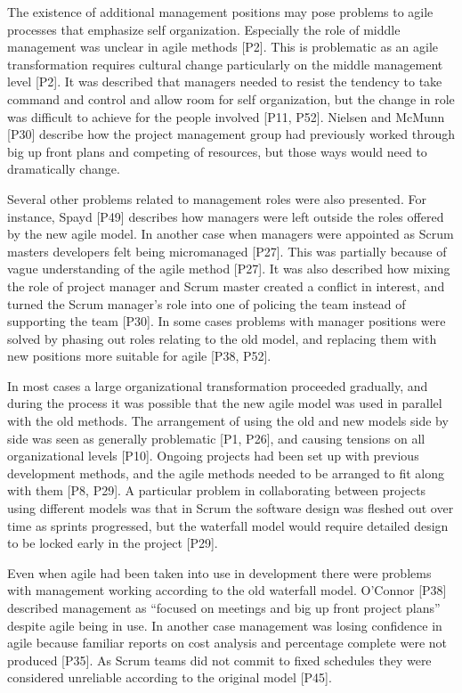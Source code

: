 
The existence of additional management positions may pose problems to agile
processes that emphasize self organization.
Especially the role of middle management was unclear in agile methods [P2]. This
is problematic as an agile transformation requires cultural change particularly
on the middle management level [P2].
It was described that managers needed to resist the tendency to take command and
control and allow room for self organization, but the change in role was
difficult to achieve for the people involved [P11, P52].
Nielsen and McMunn [P30] describe how the project management group had
previously worked through big up front plans and competing of resources, but
those ways would need to dramatically change.

Several other problems related to management roles were also presented. For
instance, Spayd [P49] describes how managers were left outside the roles offered
by the new agile model. In another case when managers were appointed as Scrum
masters developers felt being micromanaged [P27]. This was partially because of
vague understanding of the agile method [P27]. It was also described how mixing
the role of project manager and Scrum master created a conflict in interest, and
turned the Scrum manager's role into one of policing the team instead of
supporting the team [P30]. In some cases problems with manager positions were
solved by phasing out roles relating to the old model, and replacing them with
new positions more suitable for agile [P38, P52].


In most cases a large organizational transformation proceeded gradually, and
during the process it was possible that the new agile model was used in parallel
with the old methods. The arrangement of using the old and new models side by
side was seen as generally problematic [P1, P26], and causing tensions on all
organizational levels [P10]. Ongoing projects had been set up with previous
development methods, and the agile methods needed to be arranged to fit along
with them [P8, P29]. A particular problem in collaborating between projects
using different models was that in Scrum the software design was fleshed out
over time as sprints progressed, but the waterfall model would require detailed
design to be locked early in the project [P29].

Even when agile had been taken into use in development there were problems with
management working according to the old waterfall model. O'Connor [P38]
described management as ``focused on meetings and big up front project plans''
despite agile being in use. In another case management was losing confidence in
agile because familiar reports on cost analysis and percentage complete were not
produced [P35]. As Scrum teams did not commit to fixed schedules they were
considered unreliable according to the original model [P45].

